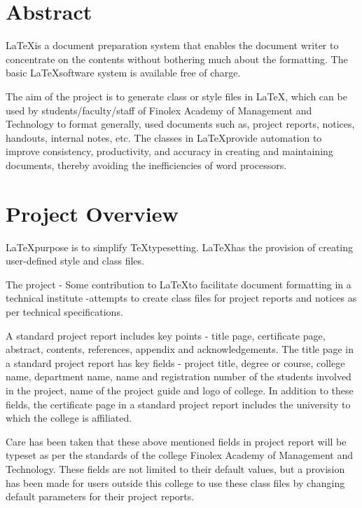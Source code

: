 \documentclass{ProjectReport}
\begin{document}
\frontmatter
{}
\makepreliminarypages

\chapter*{Abstract}
\LaTeX is a document preparation system that enables the document writer to concentrate on the contents without bothering much about the formatting. The basic \LaTeX software system is available free of charge.

The aim of the project is to generate class or style files in \LaTeX, which can be used by students/faculty/staff of Finolex Academy of Management and Technology to format generally, used documents such as, project reports, notices, handouts, internal notes, etc. The classes in \LaTeX provide automation to improve consistency, productivity, and accuracy in creating and maintaining documents, thereby avoiding the inefficiencies of word processors.

\tableofcontents
\listoffigures

\mainmatter
\chapter{Project Overview}
\setcounter{page}{1}
\thispagestyle{empty}
\LaTeX purpose is to simplify \TeX typesetting. \LaTeX has the provision of creating user-defined style and class files.

The project - Some contribution to \LaTeX to facilitate document formatting in a technical institute -attempts to create class files for project reports and notices as per technical specifications. 

A standard project report includes key points - title page, certificate page, abstract, contents, references, appendix and acknowledgements. The title page in a standard project report has key fields - project title, degree or course, college name, department name, name and registration number of the students involved in the project, name of the project guide and logo of college. In addition to these fields, the certificate page in a standard project report includes the university to which the college is affiliated. 

Care has been taken that these above mentioned fields in project report will be typeset as per the standards of the college Finolex Academy of Management and Technology. These fields are not limited to their default values, but a provision has been made for users outside this college to use these class files by changing default parameters for their project reports.
\end{document}
